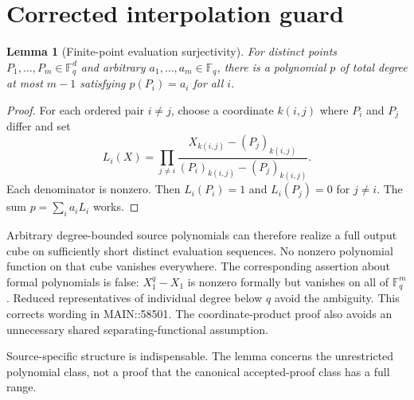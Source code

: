 \documentclass[11pt]{article}
\newtheorem{lemma}{Lemma}
\newcommand{\F}{\mathbb F}
\begin{document}
\section{Corrected interpolation guard}
\begin{lemma}[Finite-point evaluation surjectivity]
For distinct points $P_1,\ldots,P_m\in\F_q^d$ and arbitrary
$a_1,\ldots,a_m\in\F_q$, there is a polynomial $p$ of total degree
at most $m-1$ satisfying $p(P_i)=a_i$ for all $i$.
\end{lemma}
\begin{proof}
For each ordered pair $i\ne j$, choose a coordinate $k(i,j)$ where
$P_i$ and $P_j$ differ and set
\[
 L_i(X)=
 \prod_{j\ne i}
 \frac{X_{k(i,j)}-(P_j)_{k(i,j)}}
      {(P_i)_{k(i,j)}-(P_j)_{k(i,j)}}.
\]
Each denominator is nonzero. Then $L_i(P_i)=1$ and
$L_i(P_j)=0$ for $j\ne i$. The sum $p=\sum_i a_iL_i$ works.
\end{proof}
Arbitrary degree-bounded source polynomials can therefore realize a
full output cube on sufficiently short distinct evaluation sequences.
No nonzero polynomial function on that cube vanishes everywhere.
The corresponding assertion about formal polynomials is false:
$X_1^q-X_1$ is nonzero formally but vanishes on all of $\F_q^m$.
Reduced representatives of individual degree below $q$ avoid the
ambiguity. This corrects wording in MAIN::58501. The coordinate-product
proof also avoids an unnecessary shared separating-functional assumption.

Source-specific structure is indispensable. The lemma concerns the
unrestricted polynomial class, not a proof that the canonical
accepted-proof class has a full range.
\end{document}
